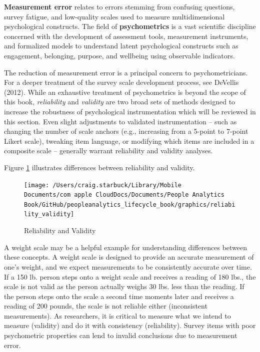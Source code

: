 \documentclass[
]{book}
\begin{document}
\textbf{Measurement error} relates to errors stemming from confusing questions, survey fatigue, and low-quality scales used to measure multidimensional psychological constructs. The field of \textbf{psychometrics} is a vast scientific discipline concerned with the development of assessment tools, measurement instruments, and formalized models to understand latent psychological constructs such as engagement, belonging, purpose, and wellbeing using observable indicators.

The reduction of measurement error is a principal concern to psychometricians. For a deeper treatment of the survey scale development process, see DeVellis (2012). While an exhaustive treatment of psychometrics is beyond the scope of this book, \emph{reliability} and \emph{validity} are two broad sets of methods designed to increase the robustness of psychological instrumentation which will be reviewed in this section. Even slight adjustments to validated instrumentation -- such as changing the number of scale anchors (e.g., increasing from a 5-point to 7-point Likert scale), tweaking item language, or modifying which items are included in a composite scale -- generally warrant reliability and validity analyses.

Figure \ref{fig:reli-vali} illustrates differences between reliability and validity.

\begin{figure}

{\centering \texttt{[image: /Users/craig.starbuck/Library/Mobile Documents/com~apple~CloudDocs/Documents/People Analytics Book/GitHub/peopleanalytics\_lifecycle\_book/graphics/reliability\_validity]} 

}

\caption{Reliability and Validity}\label{fig:reli-vali}
\end{figure}

A weight scale may be a helpful example for understanding differences between these concepts. A weight scale is designed to provide an accurate measurement of one's weight, and we expect measurements to be consistently accurate over time. If a 150 lb. person steps onto a weight scale and receives a reading of 180 lbs., the scale is not valid as the person actually weighs 30 lbs. less than the reading. If the person steps onto the scale a second time moments later and receives a reading of 200 pounds, the scale is not reliable either (inconsistent measurements). As researchers, it is critical to measure what we intend to measure (validity) and do it with consistency (reliability). Survey items with poor psychometric properties can lend to invalid conclusions due to measurement error.
\end{document}

